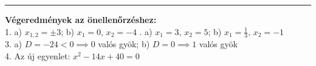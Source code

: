\documentclass[11pt,a4paper]{article}
\begin{document}
\vspace{0.4cm}
\hrule
\vspace{0.2cm}
{\footnotesize \textbf{Végeredmények az önellenőrzéshez:}\\
1. a) $x_{1,2} = \pm 3$; \quad b) $x_1 = 0, \, x_2 = -4$ . a) $x_1 = 3, \, x_2 = 5$; \quad b) $x_1 = \frac{1}{3}, \, x_2 = -1$\\
3. a) $D = -24 < 0 \implies 0$ valós gyök; \quad b) $D = 0 \implies 1$ valós gyök\\
4. Az új egyenlet: $x^2 - 14x + 40 = 0$}
\end{document}

